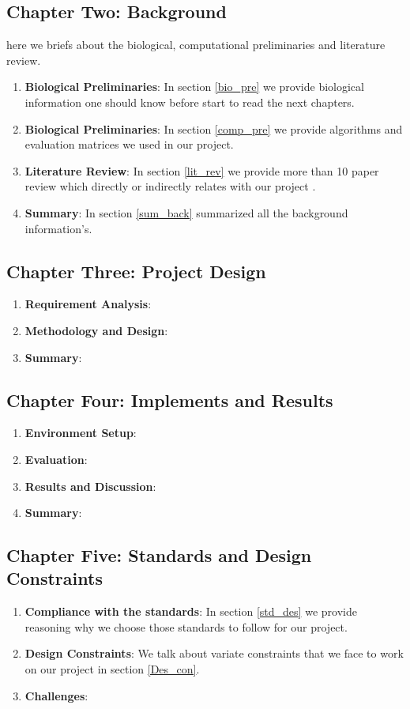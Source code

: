 \subsection{Chapter Two: Background}
here we briefs about the biological, computational preliminaries and literature review.
\begin{enumerate}
  \item \textbf{Biological Preliminaries}: In section \ref{bio_pre} we provide biological information one should know before start to read the next chapters.
  \item \textbf{Biological Preliminaries}: In section \ref{comp_pre} we provide algorithms and evaluation matrices we used in our project.
  \item \textbf{Literature Review}: In section \ref{lit_rev} we provide more than 10 paper review which directly or indirectly relates with our project .
  \item \textbf{Summary}: In section \ref{sum_back} summarized all the background information's.
\end{enumerate}

\subsection{Chapter Three: Project Design}
\begin{enumerate}
  \item \textbf{Requirement Analysis}: 
  \item \textbf{Methodology and Design}:
  \item \textbf{Summary}: 
\end{enumerate}

\subsection{Chapter Four: Implements and Results}
\begin{enumerate}
  \item \textbf{Environment Setup}: 
  \item \textbf{Evaluation}:
  \item \textbf{Results and Discussion}:
  \item \textbf{Summary}: 
\end{enumerate}

\subsection{Chapter Five: Standards and Design Constraints}
\begin{enumerate}
  \item \textbf{Compliance with the standards}: In section \ref{std_des} we provide reasoning why we choose those standards to follow for our project.
  \item \textbf{Design Constraints}: We talk about variate constraints that we face to work on our project in section \ref{Des_con}.
  \item \textbf{Challenges}: 
\end{enumerate}